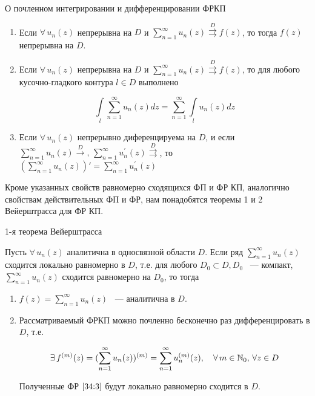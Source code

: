 \documentclass[../../main.tex]{subfiles}
\begin{document}
\begin{thm}{О почленном интегрировании и дифференцировании ФРКП}
	\begin{enumerate}
		\item Если $ \forall\, u_n (z) $ непрерывна на $ D $ и $ \sum\limits_{n = 1}^{\infty} u_n(z) \overset{D}\rightrightarrows f(z) $, то тогда $ f(z) $ непрерывна на $ D $.
		
		\item Если $ \forall\, u_n (z) $ непрерывна на $ D $ и $ \sum\limits_{n = 1}^{\infty} u_n(z) \overset{D}\rightrightarrows f(z) $, то для любого кусочно-гладкого контура $ l \in D $ выполнено
		
		\[ \int\limits_l \sum\limits_{n = 1}^{\infty} u_n(z) dz = \sum\limits_{n = 1}^{\infty} \int\limits_l  u_n(z) dz \]
		
		\item Если $ \forall\, u_n(z) $ непрерывно диференцируема на $ D $, и если $ \sum\limits_{n = 1}^{\infty} u_n(z) \overset{D}{\longrightarrow},\, \sum\limits_{n = 1}^{\infty} u_n^{'}(z) \overset{D}\rightrightarrows $, то $ (\sum\limits_{n = 1}^{\infty} u_n(z))' = \sum\limits_{n = 1}^{\infty} u_n^{'}(z) $
	\end{enumerate}
\end{thm}

Кроме указанных свойств равномерно сходящихся ФП и ФР КП, аналогично свойствам действительных ФП и ФР, нам понадобятся теоремы 1 и 2 Вейерштрасса для ФР КП.

\begin{thm}{1-я теорема Вейерштрасса}
	\;
	
	Пусть $ \forall\, u_n(z) $ аналитична в односвязной области $ D $. Если ряд $ \sum\limits_{n = 1}^{\infty} u_n(z) $ сходится локально равномерно в $ D $, т.е. для любого $ D_0 \subset D, D_0 $ ~--- компакт, $ \sum\limits_{n = 1}^{\infty} u_n(z) $ сходится равномерно на $ D_0 $, то тогда
	
	\begin{enumerate}
		\item  $ f(z) = \sum\limits_{n = 1}^{\infty} u_n(z) $ ~--- аналитична в $ D $.
		
		\item Рассматриваемый ФРКП можно почленно бесконечно раз дифференцировать в $ D $, т.е.
		
		\begin{equation}\label{34:3}
			 \exists\, f^{(m)}(z) = (\sum\limits_{n = 1}^{\infty} u_n(z))^{(m)} = \sum\limits_{n = 1}^{\infty} u_n^{(m)} (z), \quad \forall\, m \in \mathbb{N}_0,\, \forall z \in D
		\end{equation}
		
		Полученные ФР $ \eqref{34:3} $ будут локально равномерно сходится в $ D $.
	\end{enumerate}
\end{thm}
\end{document}
